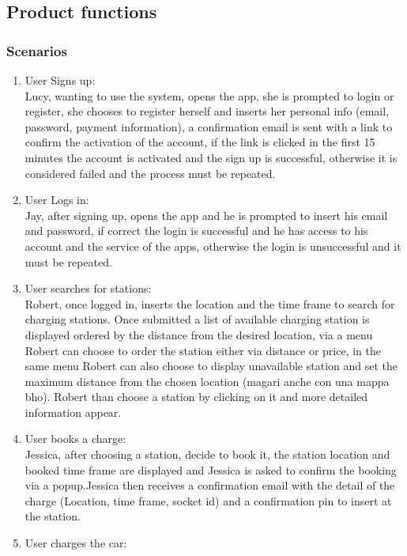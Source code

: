 \subsection{Product functions}

\subsubsection{Scenarios}
\begin{enumerate}[label=S\arabic*]
    \item User Signs up:\\
          Lucy, wanting to use the system, opens the app, she is prompted to login or register, she chooses to register herself and inserts her personal info (email, password, payment information), a confirmation email is sent with a link to confirm the activation of the account, if the link is clicked in the first 15 minutes the account is activated and the sign up is successful, otherwise it is considered failed and the process must be repeated.
    \item User Logs in:\\
          Jay, after signing up, opens the app and he is prompted to insert his email and password, if correct the login is successful and he has access to his account and the service of the apps, otherwise the login is unsuccessful and it must be repeated.
    \item User searches for stations:\\
          Robert, once logged in, inserts the location and the time frame to search for charging stations. Once submitted a list of available charging station is displayed ordered by the distance from the desired location, via a menu Robert can choose to order the station either via distance or price, in the same menu Robert can also choose to display unavailable station and set the maximum distance from the chosen location (magari anche con una mappa bho). Robert than choose a station by clicking on it and more detailed information appear.
    \item User books a charge:\\
          Jessica, after choosing a station, decide to book it, the station location and booked time frame are displayed and Jessica is asked to confirm the booking via a popup.Jessica then receives a confirmation email with the detail of the charge (Location, time frame, socket id) and a confirmation pin to insert at the station.
    \item User charges the car:\\

\end{enumerate}
